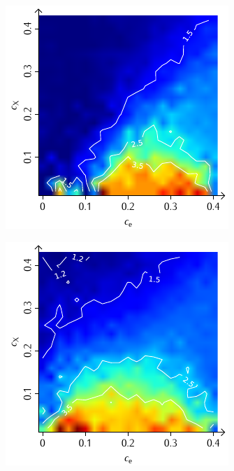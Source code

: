 \documentclass[a4paper, 10pt, twoside, openany]{book} %
\begin{document}
\begin{figure}
\begin{minipage}[t]{0.48\textwidth}
        \label{H_penalty_cluster_D}
    \end{minipage}
    \begin{minipage}[t]{0.48\textwidth}
        \includegraphics[width=\textwidth]{Abbildungen/Phasendiagramme/Konturen/H_random_D.pdf}
        \label{H_random_D}
    \end{minipage}
    \hfill
    \begin{minipage}[t]{0.48\textwidth}
        \includegraphics[width=\textwidth]{Abbildungen/Phasendiagramme/Konturen/H_penalty_random_D.pdf}

\end{minipage}
\end{figure}
\end{document}
